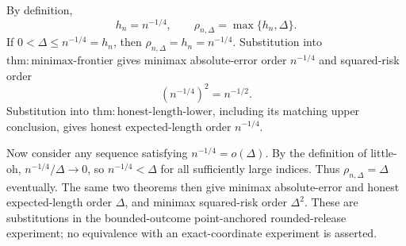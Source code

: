 By definition,
\[
 h_n=n^{-1/4},
 \qquad
 \rho_{n,\Delta}=\max\{h_n,\Delta\}.
\]
If \(0<\Delta\leq n^{-1/4}=h_n\), then \(\rho_{n,\Delta}=h_n=n^{-1/4}\).  Substitution into \(\mathrm{thm:minimax\text{-}frontier}\) gives minimax absolute-error order \(n^{-1/4}\) and squared-risk order
\[
 (n^{-1/4})^2=n^{-1/2}.
\]
Substitution into \(\mathrm{thm:honest\text{-}length\text{-}lower}\), including its matching upper conclusion, gives honest expected-length order \(n^{-1/4}\).

Now consider any sequence satisfying \(n^{-1/4}=o(\Delta)\).  By the definition of little-oh, \(n^{-1/4}/\Delta\to0\), so \(n^{-1/4}<\Delta\) for all sufficiently large indices.  Thus \(\rho_{n,\Delta}=\Delta\) eventually.  The same two theorems then give minimax absolute-error and honest expected-length order \(\Delta\), and minimax squared-risk order \(\Delta^2\).  These are substitutions in the bounded-outcome point-anchored rounded-release experiment; no equivalence with an exact-coordinate experiment is asserted.